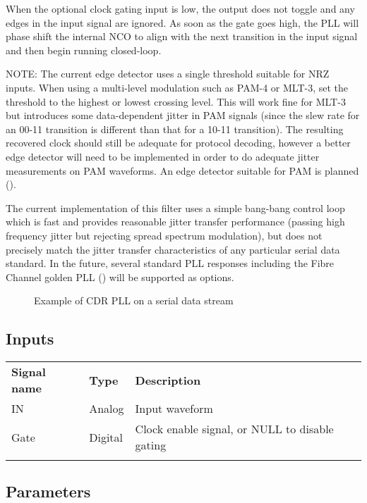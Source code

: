 When the optional clock gating input is low, the output does not toggle and any edges in the input signal are ignored.
As soon as the gate goes high, the PLL will phase shift the internal NCO to align with the next transition in the input
signal and then begin running closed-loop.

NOTE: The current edge detector uses a single threshold suitable for NRZ inputs. When using a multi-level modulation
such as PAM-4 or MLT-3, set the threshold to the highest or lowest crossing level. This will work fine for MLT-3 but
introduces some data-dependent jitter in PAM signals (since the slew rate for an 00-11 transition is different than
that for a 10-11 transition). The resulting recovered clock should still be adequate for protocol decoding, however a
better edge detector will need to be implemented in order to do adequate jitter measurements on PAM waveforms. An edge
detector suitable for PAM is planned ().

The current implementation of this filter uses a simple bang-bang control loop which is fast and provides reasonable
jitter transfer performance (passing high frequency jitter but rejecting spread spectrum modulation), but does not
precisely match the jitter transfer characteristics of any particular serial data standard. In the future, several
standard PLL responses including the Fibre Channel golden PLL () will be supported as options.

\begin{figure}[h]
\centering
{}
\caption{Example of CDR PLL on a serial data stream}
\label{filter_cdrpll}
\end{figure}

\subsection{Inputs}

\begin{tabularx}{16cm}{llX}
\thickhline
\textbf{Signal name} & \textbf{Type} & \textbf{Description} \\
\thickhline
IN & Analog & Input waveform \\
\thinhline
Gate & Digital & Clock enable signal, or NULL to disable gating\\
\thickhline
\end{tabularx}

\subsection{Parameters}

